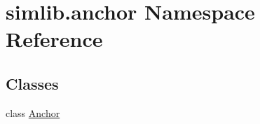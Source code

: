 \hypertarget{namespacesimlib_1_1anchor}{}\section{simlib.\+anchor Namespace Reference}
\label{namespacesimlib_1_1anchor}
\subsection*{Classes}
\begin{DoxyCompactItemize}
\item 
class \mbox{\hyperlink{classsimlib_1_1anchor_1_1_anchor}{Anchor}}
\end{DoxyCompactItemize}
